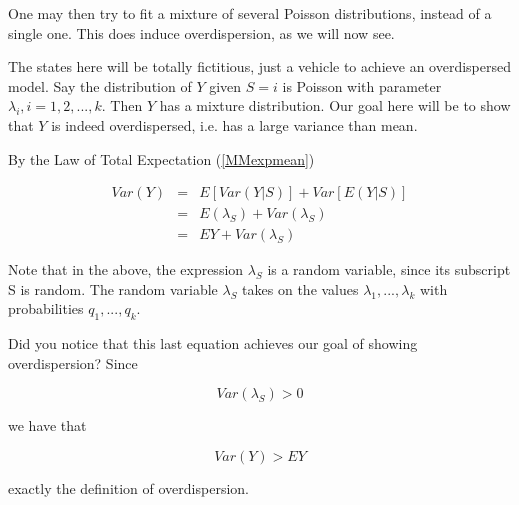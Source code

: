 \documentclass[11pt]{article}
\begin{document}
One may then try to fit a mixture of several Poisson distributions,
instead of a single one.  This does induce overdispersion, as we will
now see.  

The states here will be totally fictitious, just a vehicle to achieve an
overdispersed model.  Say the distribution of $Y$ given $S = i$ is
Poisson with parameter $\lambda_i, i = 1,2,...,k$.  Then $Y$ has a
mixture distribution.  Our goal here will be to show that $Y$ is indeed
overdispersed, i.e. has a large variance than mean.

By the Law of Total Expectation (\ref{MMexpmean})

\begin{eqnarray}
Var(Y) &=& E[Var(Y|S)] + Var[E(Y|S)] \\ 
&=& E(\lambda_S) + Var(\lambda_S) \label{thislast} \\
&=& EY + Var(\lambda_S) \label{thislast} 
\end{eqnarray}


Note that in the above, the expression $\lambda_S$ is a random variable,
since its subscript S is random.  The random variable $\lambda_S$ takes
on the values $\lambda_1,...,\lambda_k$ with probabilities
$q_1,...,q_k$.


Did you notice that this last equation achieves our goal of showing
overdispersion?  Since

\begin{equation}
Var(\lambda_S) > 0
\end{equation}

we have that

\begin{equation}
Var(Y) > EY
\end{equation}

exactly the definition of overdispersion.
\end{document}
